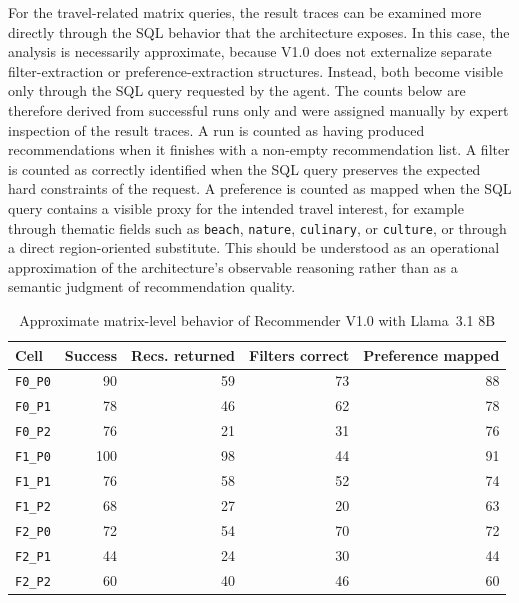 For the travel-related matrix queries, the result traces can be examined more directly through the SQL behavior that the architecture exposes. In this case, the analysis is necessarily approximate, because V1.0 does not externalize separate filter-extraction or preference-extraction structures. Instead, both become visible only through the SQL query requested by the agent. The counts below are therefore derived from successful runs only and were assigned manually by expert inspection of the result traces. A run is counted as having produced recommendations when it finishes with a non-empty recommendation list. A filter is counted as correctly identified when the SQL query preserves the expected hard constraints of the request. A preference is counted as mapped when the SQL query contains a visible proxy for the intended travel interest, for example through thematic fields such as \texttt{beach}, \texttt{nature}, \texttt{culinary}, or \texttt{culture}, or through a direct region-oriented substitute. This should be understood as an operational approximation of the architecture's observable reasoning rather than as a semantic judgment of recommendation quality.

\begin{table}[htbp]
\centering
\begin{tabular}{lrrrr}
\hline
Cell & Success & Recs. returned & Filters correct & Preference mapped \\
\hline
\texttt{F0\_P0} & 90 & 59 & 73 & 88 \\
\texttt{F0\_P1} & 78 & 46 & 62 & 78 \\
\texttt{F0\_P2} & 76 & 21 & 31 & 76 \\
\texttt{F1\_P0} & 100 & 98 & 44 & 91 \\
\texttt{F1\_P1} & 76 & 58 & 52 & 74 \\
\texttt{F1\_P2} & 68 & 27 & 20 & 63 \\
\texttt{F2\_P0} & 72 & 54 & 70 & 72 \\
\texttt{F2\_P1} & 44 & 24 & 30 & 44 \\
\texttt{F2\_P2} & 60 & 40 & 46 & 60 \\
\hline
\end{tabular}
\caption{Approximate matrix-level behavior of Recommender V1.0 with Llama~3.1 8B}
\label{table:recommendation-generation:v1-0-llama-matrix-analysis}
\end{table}

